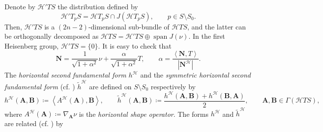 \documentclass[11pt]{amsart}
\newcommand{\hhh}{{\mathcal{H}}}
\newcommand{\n}[1]{\nabla^\varepsilon_{ #1 }}
\newcommand{\vh}{\nu}
\newcommand{\hh}{{\mathbb{H}}}
\newcommand{\eps}{\varepsilon}
\newcommand{\s}{\mathcal S}
\newcommand{\A}{\mathbf{A}}
\newcommand{\B}{\mathbf{B}}
\renewcommand{\n}{\mathbf{N}}
\DeclareMathOperator{\spann}{span}
\theoremstyle{definition}
\theoremstyle{remark}
\numberwithin{equation}{section}
\begin{document}
   Denote by $\hhh' TS$ the distribution defined by
\begin{equation*}
    \hhh'T_p S=\hhh T_pS\cap J\left(\hhh T_p S\right),\qquad p\in S\setminus S_0.
\end{equation*}
Then, $\hhh'TS$ is a $(2n-2)$-dimensional sub-bundle of $\hhh TS$, and the latter can be orthogonally decomposed as $
    \hhh TS=\hhh' TS\oplus\spann J(\vh). $
In the first Heisenberg group, $\hhh' TS=\{0\}$. 
It is easy to check that 
\begin{equation*}
    \n=\frac{1}{\sqrt{1+\alpha^2}}\vh+\frac{\alpha}{\sqrt{1+\alpha^2}}T,\qquad \alpha=\frac{\left\langle \n,T\right\rangle}{|\n^\hhh|}.
\end{equation*}
The \emph{horizontal second fundamental form} $h^\hhh$ and the \emph{symmetric horizontal second fundamental form} (cf. \cite{simons,MR4193432}) $\tilde h^\hhh$ are defined on $S\setminus S_0$ respectively by
\begin{equation*}
    h^\hhh(\A,\B)\coloneqq\left\langle A^\hhh(\A),\B\right\rangle,\qquad \tilde h^\hhh(\A,\B)\coloneqq\frac{h^\hhh(\A,\B)+h^\hhh(\B,\A)}{2},\qquad\A,\B\in\Gamma(\hhh TS),
\end{equation*}
 where $ A^\hhh(\A)\coloneqq \nabla_\A\vh$ is the \emph{horizontal shape operator}. The forms $h^\hhh$ and $\tilde h^\hhh$ are related (cf. \cite{simons}) by
\end{document}
